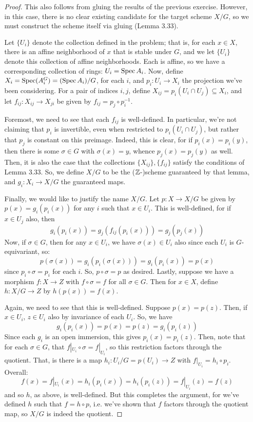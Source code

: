 \begin{proof}
	This also follows from gluing the results of the previous exercise. However, in this case, there is no clear existing candidate for the target scheme $X/G$, so we must construct the scheme itself via gluing (Lemma 3.33).
	
	Let $\{U_i\}$ denote the collection defined in the problem; that is, for each $x \in X$, there is an affine neighborhood of $x$ that is stable under $G$, and we let $\{U_i\}$ denote this collection of affine neighborhoods. Each is affine, so we have a corresponding collection of rings: $U_i = \operatorname{Spec} A_i$. Now, define $X_i = \operatorname{Spec}(A_i^G) = (\operatorname{Spec} A_i)/G$, for each $i$, and $p_i : U_i \to X_i$ the projection we've been considering. For a pair of indices $i,j$, define $X_{ij} = p_i(U_i \cap U_j) \subseteq X_i$, and let $f_{ij} : X_{ij} \to X_{ji}$ be given by $f_{ij} = p_j \circ p_i^{-1}$.
	
	Foremost, we need to see that each $f_{ij}$ is well-defined. In particular, we're not claiming that $p_i$ is invertible, even when restricted to $p_i(U_i \cap U_j)$, but rather that $p_j$ is constant on this preimage. Indeed, this is clear, for if $p_i(x) = p_i(y)$, then there is some $\sigma \in G$ with $\sigma(x) = y$, whence $p_j(x) = p_j(y)$ as well. Then, it is also the case that the collections $\{X_{ij}\},\{f_{ij}\}$ satisfy the conditions of Lemma 3.33. So, we define $X/G$ to be the ($\mathbb{Z}$-)scheme guaranteed by that lemma, and $g_i : X_i \to X/G$ the guaranteed maps.
	
	Finally, we would like to justify the name $X/G$. Let $p : X \to X/G$ be given by $p(x) = g_i(p_i(x))$ for any $i$ such that $x \in U_i$. This is well-defined, for if $x \in U_j$ also, then
	\[ g_i(p_i(x)) = g_j(f_{ij}(p_i(x))) = g_j(p_j(x)) \]
	Now, if $\sigma \in G$, then for any $x \in U_i$, we have $\sigma(x) \in U_i$ also since each $U_i$ is $G$-equivariant, so:
	\[ p(\sigma(x)) = g_i(p_i(\sigma(x))) = g_i(p_i(x)) = p(x) \]
	since $p_i \circ \sigma = p_i$ for each $i$. So, $p \circ \sigma = p$ as desired. Lastly, suppose we have a morphism $f : X \to Z$ with $f \circ \sigma = f$ for all $\sigma \in G$. Then for $x \in X$, define $h : X/G \to Z$ by $h(p(x)) = f(x)$.
	
	Again, we need to see that this is well-defined. Suppose $p(x) = p(z)$. Then, if $x \in U_i$, $z \in U_i$ also by invariance of each $U_i$. So, we have
	\[ g_i(p_i(x)) = p(x) = p(z) = g_i(p_i(z)) \]
	Since each $g_i$ is an open immersion, this gives $p_i(x) = p_i(z)$. Then, note that for each $\sigma \in G$, that $f|_{U_i} \circ \sigma = f|_{U_i}$, so this restriction factors through the quotient. That, is there is a map $h_i : U_i/G = p(U_i) \to Z$ with $f|_{U_i} = h_i \circ p_i$. Overall:
	\[ f(x) = f|_{U_i}(x) = h_i(p_i(x)) = h_i(p_i(z)) = f|_{U_i}(z) = f(z) \]
	and so $h$, as above, is well-defined. But this completes the argument, for we've defined $h$ such that $f = h \circ p$, i.e. we've shown that $f$ factors through the quotient map, so $X/G$ is indeed the quotient.
\end{proof}

